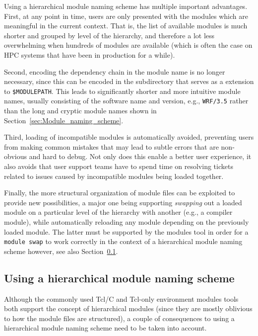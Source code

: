 
Using a hierarchical module naming scheme has multiple important
advantages. First, at any point in time, users are only presented with the
modules which are meaningful in the current context. That is, the list of
available modules is much shorter and grouped by level of the hierarchy,
and therefore a lot less overwhelming when hundreds of modules are
available (which is often the case on HPC systems that have been in
production for a while).

Second, encoding the dependency chain in the module name is no longer
necessary, since this can be encoded in the subdirectory that serves as a
extension to
\texttt{\small \$MODULEPATH}. This leads to significantly shorter and more intuitive
module names, usually consisting of the software name and version, e.g.,
\texttt{\small WRF/3.5} rather than the long and cryptic module names shown in
Section~\ref{sec:Module_naming_scheme}.

Third, loading of incompatible
modules is automatically avoided, preventing users from making common
mistakes that may lead to subtle errors that are non-obvious and hard to
debug. Not only does this enable a better user experience, it also avoids
that user support teams have to spend time on resolving tickets related
to issues caused by incompatible modules being loaded together.

Finally, the more structural organization of module files can be exploited
to provide new possibilities, a major one being supporting \emph{swapping}
out a loaded module on a particular level of the hierarchy with another
(e.g., a compiler module), while automatically reloading any module depending
on the previously loaded module. The latter must be supported by the modules tool
in order for a \texttt{\small module swap} to work correctly in the context of
a hierarchical module naming scheme however, see also
Section~\ref{sec:using_a_hierarchy}.


\subsection{Using a hierarchical module naming scheme}
\label{sec:using_a_hierarchy}

Although the commonly used Tcl/C and Tcl-only environment modules tools
both support the concept of hierarchical modules (since they are mostly
oblivious to how the module files are structured), a couple of consequences
to using a hierarchical module naming scheme need to be taken into account.

